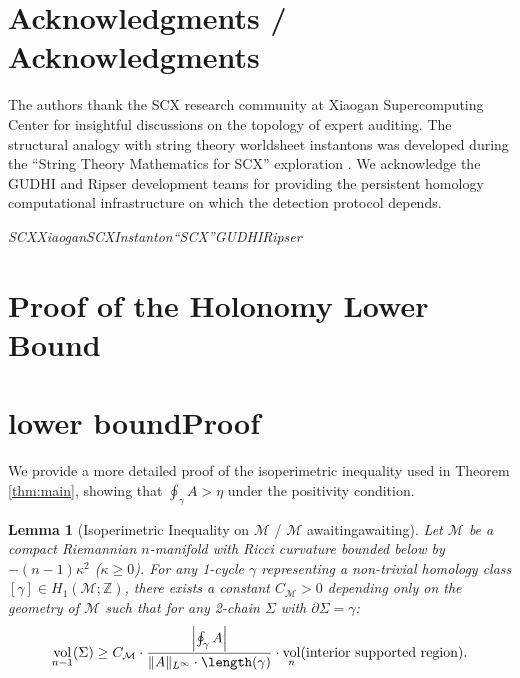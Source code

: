 \documentclass[11pt,a4paper]{article}
\theoremstyle{plain}
\newtheorem{lemma}[theorem]{Lemma}
\theoremstyle{definition}
\DeclareMathOperator{\vol}{vol}
\newcommand{\Z}{\mathbb{Z}}
\newcommand{\cM}{\mathcal{M}}
\begin{document}
\section*{Acknowledgments / Acknowledgments}

The authors thank the SCX research community at Xiaogan Supercomputing 
Center for insightful discussions on the topology of expert auditing. 
The structural analogy with string theory worldsheet instantons was 
developed during the ``String Theory Mathematics for SCX'' exploration 
\cite{scx_string_exploration}. We acknowledge the GUDHI and Ripser 
development teams for providing the persistent homology computational 
infrastructure on which the detection protocol depends.

\bigskip
\noindent
\textit{SCXXiaoganSCXInstanton``SCX''GUDHIRipser}

\appendix
\section{Proof of the Holonomy Lower Bound}
\section*{lower boundProof}

We provide a more detailed proof of the isoperimetric inequality used in 
Theorem \ref{thm:main}, showing that $\oint_{\gamma} A > \eta$ under the 
positivity condition.

\begin{lemma}[Isoperimetric Inequality on $\cM$ / $\cM$ awaitingawaiting]
\label{lem:isoperimetric}
Let $\cM$ be a compact Riemannian $n$-manifold with Ricci curvature bounded 
below by $-(n-1)\kappa^2$ ($\kappa \geq 0$). For any 1-cycle $\gamma$ 
representing a non-trivial homology class $[\gamma] \in H_1(\cM; \Z)$, there 
exists a constant $C_{\cM} > 0$ depending only on the geometry of $\cM$ 
such that for any 2-chain $\Sigma$ with $\partial \Sigma = \gamma$:
\begin{equation}
  \vol_{n-1}(\Sigma) \geq C_{\cM} \cdot \frac{\left|\oint_{\gamma} A\right|}
    {\|A\|_{L^{\infty}} \cdot \length(\gamma)} \cdot \vol_n(\text{interior supported region}).
  \label{eq:isop}
\end{equation}
\end{lemma}
\end{document}
